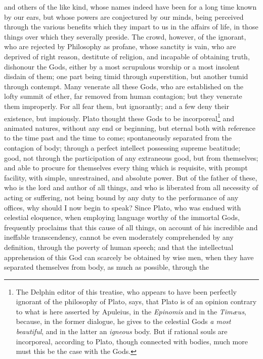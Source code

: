 \documentclass[twoside]{article}
\begin{document}
\noindent and others of the like kind, whose names indeed have been for a long
time known by our ears, but whose powers are conjectured by our minds, being
perceived through the various benefits which they impart to us in the affairs
of life, in those things over which they severally preside. The crowd, however,
of the ignorant, who are rejected by Philosophy as profane, whose sanctity is
vain, who are deprived of right reason, destitute of religion, and incapable of
obtaining truth, dishonour the Gods, either by a most scrupulous worship or a
most insolent disdain of them; one part being timid through superstition, but
another tumid through contempt. Many venerate all these Gods, who are
established on the lofty summit of ether, far removed from human contagion; but
they venerate them improperly. For all fear them, but ignorantly; and a few
deny their existence, but impiously. Plato thought these Gods to be
incorporeal\footnote{The Delphin editor of this treatise, who appears to have
been perfectly ignorant of the philosophy of Plato, says, that Plato is of an
opinion contrary to what is here asserted by Apuleius, in the \textit{Epinomis}
and in the \textit{Tim{\ae}us}, because, in the former dialogue, he gives to
the celestial Gods \textit{a most beautiful}, and in the latter an
\textit{igneous} body. But if rational souls are incorporeal, according to
Plato, though connected with bodies, much more must this be the case with the
Gods.} and animated natures, without any end or beginning, but eternal both
with reference to the time past and the time to come; spontaneously separated
from the contagion of body; through a perfect intellect possessing supreme
beatitude; good, not through the participation of any extraneous good, but from
themselves; and able to procure for themselves every thing which is requisite,
with prompt facility, with simple, unrestrained, and absolute power. But of the
father of these, who is the lord and author of all things, and who is liberated
from all necessity of acting or suffering, not being bound by any duty to the
performance of any offices, why should I now begin to speak? Since Plato, who
was endued with celestial eloquence, when employing language worthy of the
immortal Gods, frequently proclaims that this cause of all things, on account
of his incredible and ineffable transcendency, cannot be even moderately
comprehended by any definition, through the poverty of human speech; and that
the intellectual apprehension of this God can scarcely be obtained by wise men,
when they have separated themselves from body, as much as possible, through the
\end{document}

